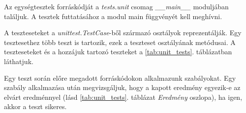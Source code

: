Az egységtesztek forráskódját a \emph{tests.unit} csomag \emph{\_\_main\_\_}
moduljában találjuk. A tesztek futtatásához a modul main függvényét kell meghívni.

A teszteseteket a \emph{unittest.TestCase}-ből származó osztályok reprezentálják.
Egy tesztesethez több teszt is tartozik, ezek a teszteset osztályának metódusai.
A teszteseteket és a hozzájuk tartozó teszteket a \ref{tab:unit_tests}. táblázatban láthatjuk.

Egy teszt során előre megadott forráskódokon alkalmazunk szabályokat.
Egy szabály alkalmazása után megvizsgáljuk, hogy a kapott eredmény egyezik-e
az elvárt eredménnyel (lásd \ref{tab:unit_tests}. táblázat \emph{Eredmény} oszlopa),
ha igen, akkor a teszt sikeres.


